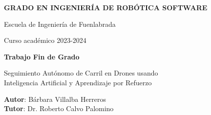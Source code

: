 \thispagestyle{empty}
\vspace{2cm}

\begin{figure}[htb]
  \centerline{}
\end{figure}

\begin{center}
  {\Large {\bf GRADO EN INGENIERÍA DE ROBÓTICA SOFTWARE}}
  \vspace{5mm}
 
  {\large {Escuela de Ingeniería de Fuenlabrada}}
  \vspace{5mm}

  {\large {Curso académico 2023-2024}}

  \vspace{1cm}

  {\large {\bf Trabajo Fin de Grado}}

  \vspace{2cm}

  {\Large {Seguimiento Autónomo de Carril en Drones usando\\
          Inteligencia Artificial y Aprendizaje por Refuerzo\\[1cm] }}

  \vspace{5cm}
  {\bf Autor}: Bárbara Villalba Herreros \\
  {\bf Tutor}: Dr. Roberto Calvo Palomino 

\end{center}

\clearpage
\thispagestyle{empty}
